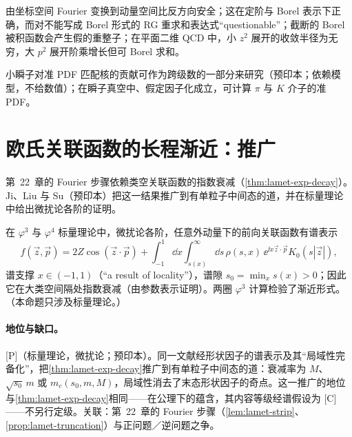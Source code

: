 \begin{remark}[坐标空间与动量空间之间变换的教训]\label{rem:yzliu-transforms}
由坐标空间 Fourier 变换到动量空间比反方向安全；这在定阶与 Borel 表示下正确，而对不能写成 Borel 形式的 RG 重求和表达式“questionable”；截断的 Borel 被积函数会产生假的重整子；在平面二维 QCD 中，小 $z^2$ 展开的收敛半径为无穷，大 $p^2$ 展开阶乘增长但可 Borel 求和\cite[第~6~节]{Liu:2024omb}。
\end{remark}

\begin{remark}[瞬子与模型研究]\label{rem:yzliu-instantons}
小瞬子对准 PDF 匹配核的贡献可作为跨级数的一部分来研究\cite{Liu:2021evw}（预印本；依赖模型，不给数值）；在瞬子真空中、假定因子化成立，可计算 $\pi$ 与 $K$ 介子的准 PDF\cite{Kock:2020frx}。
\end{remark}

\section{欧氏关联函数的长程渐近：推广}\label{sec:yzliu-decay}

第~22~章的 Fourier 步骤依赖类空关联函数的指数衰减（\cref{thm:lamet-exp-decay}）。Ji、Liu 与 Su\cite{Ji:2026vir}（预印本）把这一结果推广到有单粒子中间态的道，并在标量理论中给出微扰论各阶的证明。

\begin{proposition}\label{prop:yzliu-decay-extensions}
在 $\varphi^3$ 与 $\varphi^4$ 标量理论中，微扰论各阶，任意外动量下的前向关联函数有谱表示
\begin{equation}\label{eq:yzliu-decay-spectral}
f(\vec z,\vec p)=2Z\cos(\vec z\cdot\vec p)+\int_{-1}^1\dd x\int_{s(x)}^\infty\dd s\,\rho(s,x)\,\ee^{\ii x\vec z\cdot\vec p}K_0(s|\vec z|),
\end{equation}
谱支撑 $x\in(-1,1)$（“a result of locality”），谱隙 $s_0=\min_xs(x)>0$；因此它在大类空间隔处指数衰减（由参数表示证明\cite[第~5.3~节]{Ji:2026vir}）。两圈 $\varphi^3$ 计算检验了渐近形式。（本命题只涉及标量理论。）
\end{proposition}

\paragraph{地位与缺口。}[P]（标量理论，微扰论；预印本\cite[第~1--2、5、6~节]{Ji:2026vir}）。同一文献经形状因子的谱表示及其“局域性完备化”，把\cref{thm:lamet-exp-decay}推广到有单粒子中间态的道：衰减率为 $M$、$\sqrt{s_0}\,m$ 或 $m_c(s_0,m,M)$\cite[式~(5.21)--(5.23)]{Ji:2026vir}，局域性消去了末态形状因子的奇点。这一推广的地位与\cref{thm:lamet-exp-decay}相同——在公理下的蕴含，其内容等级经谱假设为 [C]——不另行定级。关联：第~22~章的 Fourier 步骤（\cref{lem:lamet-strip}、\cref{prop:lamet-truncation}）与正问题／逆问题之争。

